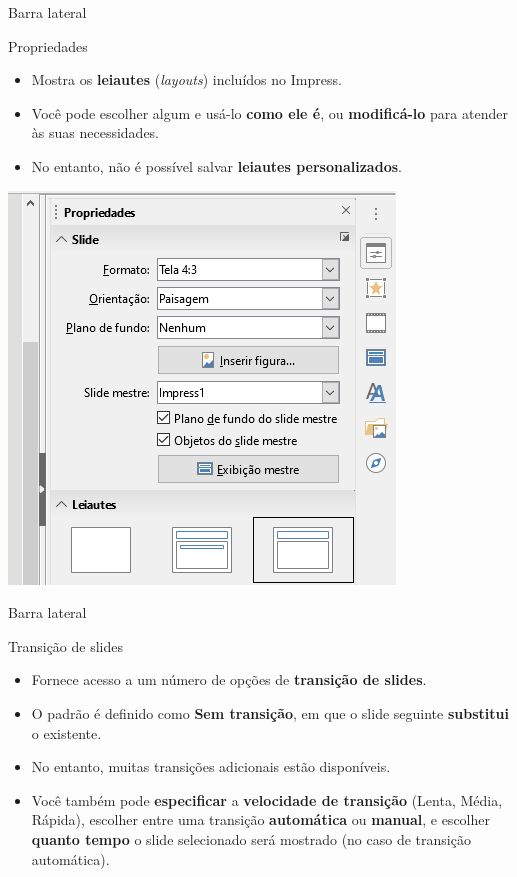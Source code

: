 \begin{frame}{Barra lateral}
	\begin{block}{Propriedades}
		\begin{itemize}
			\item Mostra os \textbf{leiautes} (\textit{layouts}) incluídos no Impress.
			\item Você pode escolher algum e usá-lo \textbf{como ele é}, ou \textbf{modificá-lo} para atender às suas necessidades.
			\item No entanto, não é possível salvar \textbf{leiautes personalizados}.
		\end{itemize}
	\end{block}

	\centering
	\includegraphics[width=0.4\linewidth]{Figuras/Ch05/fig9.1}
\end{frame}


\begin{frame}{Barra lateral}
	\begin{block}{Transição de slides}
		\begin{itemize}
			\item Fornece acesso a um número de opções de \textbf{transição de slides}.
			\item O padrão é definido como \textbf{Sem transição}, em que o slide seguinte \textbf{substitui} o existente.
			\item No entanto, muitas transições adicionais estão disponíveis.
			\item Você também pode \textbf{especificar} a \textbf{velocidade de transição} (Lenta, Média, Rápida), escolher entre uma transição \textbf{automática} ou \textbf{manual}, e escolher \textbf{quanto tempo} o slide selecionado será mostrado (no caso de transição automática).
		\end{itemize}
	\end{block}
\end{frame}



